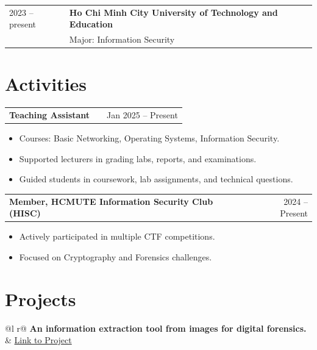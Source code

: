 \documentclass[a4paper,12pt]{article}
\makeatletter
\newenvironment{joblong}[2]
    {
    \begin{tabularx}{\linewidth}{@{}l X r@{}}
    \textbf{#1} & \hfill &  #2 \\[3.75pt]
    \end{tabularx}
    \begin{minipage}[t]{\linewidth}
    \begin{itemize}[nosep,after=\strut, leftmargin=1em, itemsep=3pt,label=--]
    }
    {
    \end{itemize}
    \end{minipage}    
    }
\makeatother
\begin{document}
\begin{tabular*}{\linewidth}{@{\extracolsep{\fill}}ll}
2023 -- present & \textbf{Ho Chi Minh City University of Technology and Education} \\
                & Major: Information Security \\
\end{tabular*}

\section{Activities}

\begin{joblong}{Teaching Assistant}{Jan 2025 -- Present}
\item Courses: Basic Networking, Operating Systems, Information Security.
\item Supported lecturers in grading labs, reports, and examinations.
\item Guided students in coursework, lab assignments, and technical questions.
\end{joblong}

\begin{joblong}{Member, HCMUTE Information Security Club (HISC)}{2024 -- Present}
\item Actively participated in multiple CTF competitions.
\item Focused on Cryptography and Forensics challenges.
\end{joblong}

\section{Projects}

\begin{tabularx}{\linewidth}{ @{}l r@{} }
\textbf{An information extraction tool from images for digital forensics.} & \hfill \href{https://mhuyyho.github.io/posts/nckh-2025/}{Link to Project} \\[3.75pt]
  \\
\end{tabularx}




\end{document}
